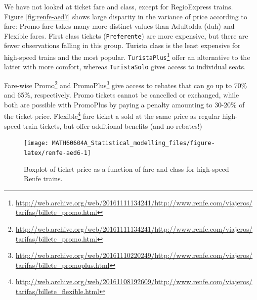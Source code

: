 \documentclass[
  11pt,
  letterpaper,
]{book}
\renewcommand{\href}[2]{#2\footnote{\url{#1}}}
\theoremstyle{definition}
\theoremstyle{definition}
\theoremstyle{definition}
\theoremstyle{definition}
\theoremstyle{remark}
\begin{document}
We have not looked at ticket fare and class, except for RegioExpress trains. Figure \ref{fig:renfe-aed7} shows large disparity in the variance of price according to fare: Promo fare takes many more distinct values than AdultoIda (duh) and Flexible fares. First class tickets (\texttt{Preferente}) are more expensive, but there are fewer observations falling in this group. Turista class is the least expensive for high-speed trains and the most popular. \href{http://web.archive.org/web/20161111134241/http://www.renfe.com/viajeros/tarifas/billete_promo.html}{\texttt{TuristaPlus}} offer an alternative to the latter with more comfort, whereas \texttt{TuristaSolo} gives access to individual seats.

Fare-wise \href{http://web.archive.org/web/20161111134241/http://www.renfe.com/viajeros/tarifas/billete_promo.html}{Promo} and \href{http://web.archive.org/web/20161110220249/http://www.renfe.com/viajeros/tarifas/billete_promoplus.html}{PromoPlus} give access to rebates that can go up to 70\% and 65\%, respectively. Promo tickets cannot be cancelled or exchanged, while both are possible with PromoPlus by paying a penalty amounting to 30-20\% of the ticket price. \href{http://web.archive.org/web/20161108192609/http://www.renfe.com/viajeros/tarifas/billete_flexible.html}{Flexible} fare ticket a sold at the same price as regular high-speed train tickets, but offer additional benefits (and no rebates!)

\begin{figure}

{\centering \texttt{[image: MATH60604A\_Statistical\_modelling\_files/figure-latex/renfe-aed6-1]} 

}

\caption{Boxplot of ticket price as a function of fare and class for high-speed Renfe trains.}\label{fig:renfe-aed6}
\end{figure}
\end{document}
